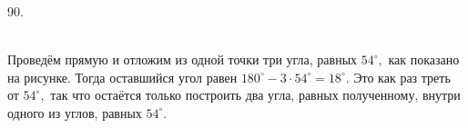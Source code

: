 90. \begin{figure}[ht!]
\end{figure}\\Проведём прямую и отложим из одной точки три угла, равных $54^\circ,$ как показано на рисунке. Тогда оставшийся угол равен $180^\circ-3\cdot54^\circ=18^\circ.$ Это как раз треть от $54^\circ,$ так что остаётся только построить два угла, равных полученному, внутри одного из углов, равных $54^\circ.$\\
